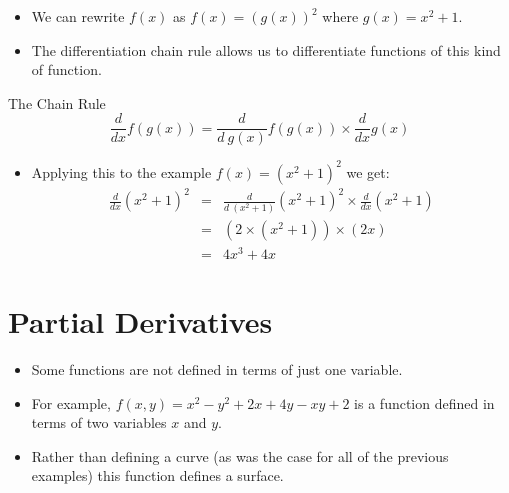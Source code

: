 \documentclass[xcolor={table}]{beamer}
\begin{document}
\begin{frame} 
\begin{itemize}
\item We can rewrite $f(x)$ as $f(x) = \left(g\left(x\right)\right)^2$ where $g(x) = x^2+1$. 
\item The differentiation \alert{chain rule} allows us to differentiate functions of this kind of function.
\end{itemize}
	\begin{alertblock}{The Chain Rule}
\begin{equation}
\frac{d }{d x} f\left(g\left(x\right)\right) = \frac{d}{d~g(x)} f\left(g\left(x\right)\right) \times \frac{d }{d x} g\left(x\right)
\end{equation}
\end{alertblock}
\end{frame}

\begin{frame} 
\begin{itemize}
\item Applying this to the example $f(x) = (x^2+1)^2$ we get:
\begin{eqnarray*}
\displaystyle \frac{d }{d x} (x^2+1)^2 & = & \displaystyle \frac{d}{d~(x^2 + 1)} (x^2+1)^2 \times \displaystyle \frac{d }{d x} (x^2+1) \\
	&	= & \left(2 \times (x^2 + 1) \right) \times \left(2x\right) \\
	&	= & 4x^3  + 4x
\end{eqnarray*}
\end{itemize}
\end{frame} 

\section{Partial Derivatives}

\begin{frame} 
\begin{itemize}
\item Some functions are not defined in terms of just one variable. 
\item For example, $f(x, y) = x^2 - y^2 + 2x + 4y - xy + 2$ is a function defined in terms of two variables $x$ and $y$. 
\item Rather than defining a curve (as was the case for all of the previous examples) this function defines a surface. 
\end{itemize}
\end{frame} 
\end{document}
